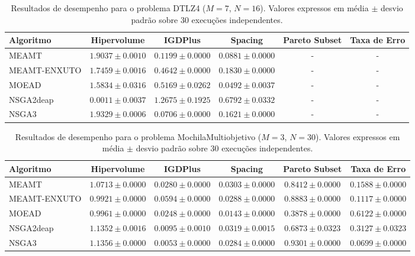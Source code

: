 \begin{table}[htpb]
\centering
\caption{Resultados de desempenho para o problema DTLZ4 ($M=7$, $N=16$). Valores expressos em média $\pm$ desvio padrão sobre 30 execuções independentes.}
\label{tab:DTLZ4_M7_N16}
\begin{tabular}{lccccc}
\hline\hline
Algoritmo & Hipervolume & IGDPlus & Spacing & Pareto Subset & Taxa de Erro \\
\hline
MEAMT & $1.9037 \pm 0.0010$ & $0.1199 \pm 0.0000$ & $0.0881 \pm 0.0000$ & - & - \\
MEAMT-ENXUTO & $1.7459 \pm 0.0016$ & $0.4642 \pm 0.0000$ & $0.1830 \pm 0.0000$ & - & - \\
MOEAD & $1.5834 \pm 0.0316$ & $0.5169 \pm 0.0262$ & $0.0492 \pm 0.0037$ & - & - \\
NSGA2deap & $0.0011 \pm 0.0037$ & $1.2675 \pm 0.1925$ & $0.6792 \pm 0.0332$ & - & - \\
NSGA3 & $1.9329 \pm 0.0006$ & $0.0706 \pm 0.0000$ & $0.1621 \pm 0.0000$ & - & - \\
\hline\hline
\end{tabular}
\end{table}

\begin{table}[htpb]
\centering
\caption{Resultados de desempenho para o problema MochilaMultiobjetivo ($M=3$, $N=30$). Valores expressos em média $\pm$ desvio padrão sobre 30 execuções independentes.}
\label{tab:MochilaMultiobjetivo_M3_N30}
\begin{tabular}{lccccc}
\hline\hline
Algoritmo & Hipervolume & IGDPlus & Spacing & Pareto Subset & Taxa de Erro \\
\hline
MEAMT & $1.0713 \pm 0.0000$ & $0.0280 \pm 0.0000$ & $0.0303 \pm 0.0000$ & $0.8412 \pm 0.0000$ & $0.1588 \pm 0.0000$ \\
MEAMT-ENXUTO & $0.9921 \pm 0.0000$ & $0.0594 \pm 0.0000$ & $0.0288 \pm 0.0000$ & $0.8883 \pm 0.0000$ & $0.1117 \pm 0.0000$ \\
MOEAD & $0.9961 \pm 0.0000$ & $0.0248 \pm 0.0000$ & $0.0143 \pm 0.0000$ & $0.3878 \pm 0.0000$ & $0.6122 \pm 0.0000$ \\
NSGA2deap & $1.1352 \pm 0.0016$ & $0.0095 \pm 0.0010$ & $0.0319 \pm 0.0015$ & $0.6873 \pm 0.0323$ & $0.3127 \pm 0.0323$ \\
NSGA3 & $1.1356 \pm 0.0000$ & $0.0053 \pm 0.0000$ & $0.0284 \pm 0.0000$ & $0.9301 \pm 0.0000$ & $0.0699 \pm 0.0000$ \\
\hline\hline
\end{tabular}
\end{table}

